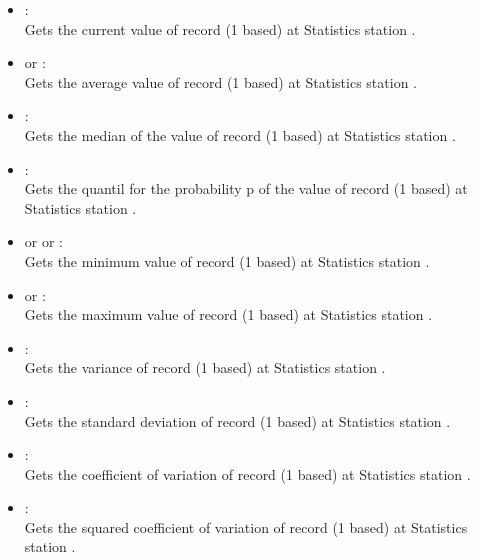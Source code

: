 \begin{itemize}

\item
{}:\\
Gets the current value of record  (1 based) at Statistics station .

\item
{} or :\\
Gets the average value of record  (1 based) at Statistics station .

\item
{}:\\
Gets the median of the value of record  (1 based) at Statistics station .

\item
{}:\\
Gets the quantil for the probability p of the value of record  (1 based) at Statistics station .

\item
or  or :\\
Gets the minimum value of record  (1 based) at Statistics station .

\item
{} or :\\
Gets the maximum value of record  (1 based) at Statistics station .

\item
{}:\\
Gets the variance of record  (1 based) at Statistics station .

\item
{}:\\
Gets the standard deviation of record  (1 based) at Statistics station .

\item
{}:\\
Gets the coefficient of variation of record  (1 based) at Statistics station .

\item
{}:\\
Gets the squared coefficient of variation of record  (1 based) at Statistics station .


\end{itemize}
